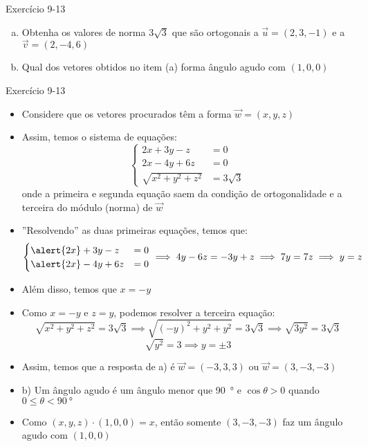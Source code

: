 \begin{frame}[c]{Exercício 9-13}
    \begin{enumerate}[(a)]
        \item Obtenha os valores de norma \(3\sqrt{3}\) que são ortogonais a \(\vec{u}=(2,3,-1)\) e a
            \(\vec{v}=(2,-4,6)\)
        \item Qual dos vetores obtidos no item (a) forma ângulo agudo com \((1,0,0)\)
    \end{enumerate}
\end{frame}
\begin{frame}{Exercício 9-13}

\begin{itemize}[<+->]
    \item Considere que os vetores procurados têm a forma \(\vec{w}=(x,y,z)\)
    \item Assim, temos o sistema de equações:
    \[
    \begin{cases}
    2x+3y-z&=0 \\ 2x-4y+6z&=0 \\ \sqrt{x^2+y^2+z^2}&=3\sqrt{3}
    \end{cases}
    \]
    onde a primeira e segunda equação saem da condição de ortogonalidade e a terceira do módulo (norma) de \(\vec{w}\)
    \item ''Resolvendo'' as duas primeiras equações, temos que:
    \[
    \begin{cases}
    \alert{2x}+3y-z&=0 \\ \alert{2x}-4y+6z&=0
    \end{cases}
    \implies 4y-6z=-3y+z \implies 7y=7z \implies y=z
    \]
    \item Além disso, temos que \(x=-y\)
\end{itemize}

\end{frame}

\begin{frame}{}
    \begin{itemize}[<+->]
        \item Como \(x=-y\) e \(z=y\), podemos resolver a terceira equação:
        \[
        \sqrt{x^2+y^2+z^2}=3\sqrt{3} \implies
        \sqrt{(-y)^2+y^2+y^2}=3\sqrt{3} \implies
        \sqrt{3y^2}=3\sqrt{3}
        \]
        \[
        \sqrt{y^2}=3 \implies y=\pm 3
        \]
        \item Assim, temos que a resposta de \alert{a)} é \(\vec{w}=(-3,3,3)\) ou \(\vec{w}=(3,-3,-3)\)
        \item b) Um ângulo agudo é um ângulo menor que \SI{90}{\degree} e \(\cos{\theta} > 0\) quando \( 0 \leq \theta < \SI{90}{\degree}\)
        \item Como \((x,y,z) \cdot (1,0,0)=x\), então somente \((3,-3,-3)\) faz um ângulo agudo com \((1,0,0)\)
    \end{itemize}
\end{frame}

